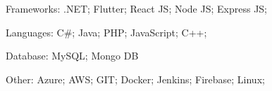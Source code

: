

\begin{cventries}

  \cventryTec
  {
    \begin{cvitems} %
      \item {Frameworks: .NET; Flutter; React JS; Node JS; Express JS;}
      \item {Languages: C\#; Java; PHP; JavaScript; C++;}
      \item {Database: MySQL; Mongo DB}
      \item {Other: Azure; AWS; GIT; Docker; Jenkins; Firebase; Linux;}
    \end{cvitems}
  }



\end{cventries}
